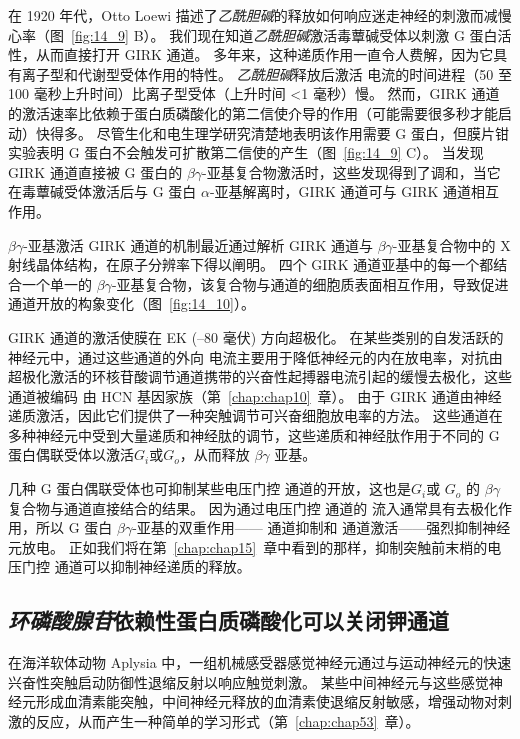 在 1920 年代，Otto Loewi 描述了\textit{乙酰胆碱}的释放如何响应迷走神经的刺激而减慢心率（图~\ref{fig:14_9} B）。
我们现在知道\textit{乙酰胆碱}激活毒蕈碱受体以刺激 G 蛋白活性，从而直接打开 GIRK 通道。
多年来，这种递质作用一直令人费解，因为它具有离子型和代谢型受体作用的特性。
\textit{乙酰胆碱}释放后激活  电流的时间进程（50 至 100 毫秒上升时间）比离子型受体（上升时间 <1 毫秒）慢。
然而，GIRK 通道的激活速率比依赖于蛋白质磷酸化的第二信使介导的作用（可能需要很多秒才能启动）快得多。 
尽管生化和电生理学研究清楚地表明该作用需要 G 蛋白，但膜片钳实验表明 G 蛋白不会触发可扩散第二信使的产生（图~\ref{fig:14_9} C）。
当发现 GIRK 通道直接被 G 蛋白的 $\beta \gamma$-亚基复合物激活时，这些发现得到了调和，当它在毒蕈碱受体激活后与 G 蛋白 $\alpha$-亚基解离时，GIRK 通道可与 GIRK 通道相互作用。


$\beta \gamma$-亚基激活 GIRK 通道的机制最近通过解析 GIRK 通道与 $\beta \gamma$-亚基复合物中的 X 射线晶体结构，在原子分辨率下得以阐明。
四个 GIRK 通道亚基中的每一个都结合一个单一的 $\beta \gamma$-亚基复合物，该复合物与通道的细胞质表面相互作用，导致促进通道开放的构象变化（图~\ref{fig:14_10}）。


GIRK 通道的激活使膜在 EK (–80 毫伏) 方向超极化。 
在某些类别的自发活跃的神经元中，通过这些通道的外向  电流主要用于降低神经元的内在放电率，对抗由超极化激活的环核苷酸调节通道携带的兴奋性起搏器电流引起的缓慢去极化，这些通道被编码 由 HCN 基因家族（第~\ref{chap:chap10}~章）。
由于 GIRK 通道由神经递质激活，因此它们提供了一种突触调节可兴奋细胞放电率的方法。
这些通道在多种神经元中受到大量递质和神经肽的调节，这些递质和神经肽作用于不同的 G 蛋白偶联受体以激活\textit{$G_i $}或$G_o$，从而释放 $\beta \gamma$ 亚基。


几种 G 蛋白偶联受体也可抑制某些电压门控  通道的开放，这也是\textit{$G_i $}或 $G_o$ 的 $\beta \gamma$ 复合物与通道直接结合的结果。
因为通过电压门控  通道的  流入通常具有去极化作用，所以 G 蛋白 $\beta \gamma$-亚基的双重作用—— 通道抑制和  通道激活——强烈抑制神经元放电。
正如我们将在第~\ref{chap:chap15}~章中看到的那样，抑制突触前末梢的电压门控  通道可以抑制神经递质的释放。



\subsection{\textit{环磷酸腺苷}依赖性蛋白质磷酸化可以关闭钾通道}

在海洋软体动物 Aplysia 中，一组机械感受器感觉神经元通过与运动神经元的快速兴奋性突触启动防御性退缩反射以响应触觉刺激。
某些中间神经元与这些感觉神经元形成血清素能突触，中间神经元释放的血清素使退缩反射敏感，增强动物对刺激的反应，从而产生一种简单的学习形式（第~\ref{chap:chap53}~章）。


